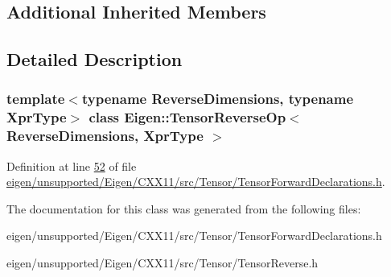 \subsection*{Additional Inherited Members}


\subsection{Detailed Description}
\subsubsection*{template$<$typename Reverse\+Dimensions, typename Xpr\+Type$>$\newline
class Eigen\+::\+Tensor\+Reverse\+Op$<$ Reverse\+Dimensions, Xpr\+Type $>$}



Definition at line \hyperlink{eigen_2unsupported_2_eigen_2_c_x_x11_2src_2_tensor_2_tensor_forward_declarations_8h_source_l00052}{52} of file \hyperlink{eigen_2unsupported_2_eigen_2_c_x_x11_2src_2_tensor_2_tensor_forward_declarations_8h_source}{eigen/unsupported/\+Eigen/\+C\+X\+X11/src/\+Tensor/\+Tensor\+Forward\+Declarations.\+h}.



The documentation for this class was generated from the following files\+:\begin{DoxyCompactItemize}
\item 
eigen/unsupported/\+Eigen/\+C\+X\+X11/src/\+Tensor/\+Tensor\+Forward\+Declarations.\+h\item 
eigen/unsupported/\+Eigen/\+C\+X\+X11/src/\+Tensor/\+Tensor\+Reverse.\+h\end{DoxyCompactItemize}
